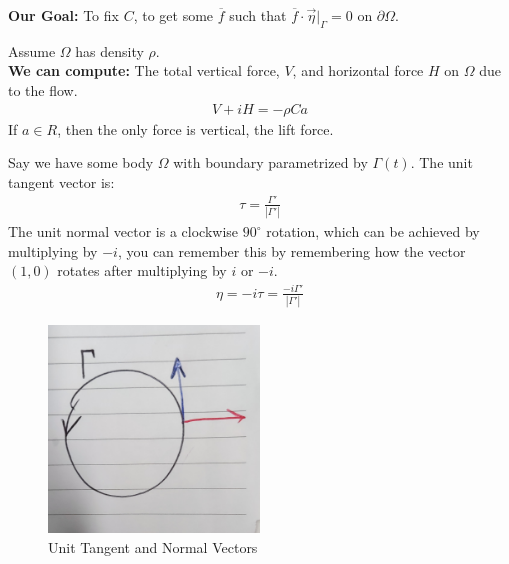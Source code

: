 \begin{example}
    \textbf{Our Goal: }To fix $C$, to get some $\overline{f}$ such that $\overline{f} \cdot \vec{\eta}|_\Gamma = 0$ on $\partial \Omega$.\\

\end{example}

\begin{proposition}
    Assume $\Omega$ has density $\rho$.\\
    \textbf{We can compute:} The total vertical force, $V$, and horizontal force $H$ on $\Omega$ due to the flow.
    \begin{align*}
        \boxed{V + iH = -\rho C a}
    \end{align*}
    If $a \in R$, then the only force is vertical, the lift force.
\end{proposition}

\begin{definition}
    Say we have some body $\Omega$ with boundary parametrized by $\Gamma(t)$. The unit tangent vector is:
    \begin{align}
        \tau = \frac{\Gamma'}{|\Gamma'|}
    \end{align}
    The unit normal vector is a clockwise $90^\circ$ rotation, which can be achieved by multiplying by $-i$, you can remember this by remembering how the vector $(1,0)$ rotates after multiplying by $i$ or $-i$.
    \begin{align}
        \eta = -i\tau = \frac{-i\Gamma'}{|\Gamma'|}
    \end{align}
    \begin{figure}[H]
        \centering
        \includegraphics[width=0.5\textwidth]{LECTURE_19/unit.jpg}
        \caption{Unit Tangent and Normal Vectors}
    \end{figure}
\end{definition}

